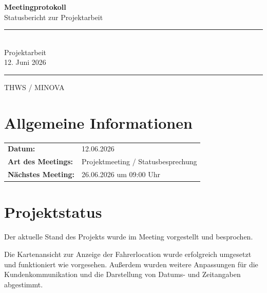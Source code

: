 \documentclass[a4paper,11pt]{article}
\begin{document}

\begin{titlepage}
\centering

\vspace*{3cm}

{\Huge \textbf{Meetingprotokoll}}\\[0.5cm]
{\Large Statusbericht zur Projektarbeit}\\[2cm]

\rule{12cm}{0.5pt}\\[0.5cm]

{\Large Projektarbeit}\\[0.3cm]
{\large 12. Juni 2026}

\rule{12cm}{0.5pt}

\vfill

{\large THWS / MINOVA}\\

\end{titlepage}


\tableofcontents
\newpage


\section{Allgemeine Informationen}

\begin{tabular}{ll}
\textbf{Datum:} & 12.06.2026 \\
\textbf{Art des Meetings:} & Projektmeeting / Statusbesprechung \\
\textbf{Nächstes Meeting:} & 26.06.2026 um 09:00 Uhr \\
\end{tabular}

\vspace{1cm}

\section{Projektstatus}

Der aktuelle Stand des Projekts wurde im Meeting vorgestellt und besprochen.

Die Kartenansicht zur Anzeige der Fahrerlocation wurde erfolgreich umgesetzt und funktioniert wie vorgesehen. Außerdem wurden weitere Anpassungen für die Kundenkommunikation und die Darstellung von Datums- und Zeitangaben abgestimmt.
\end{document}

